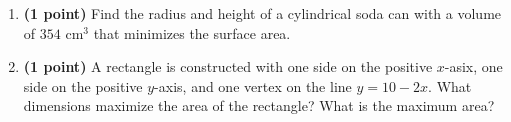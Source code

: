 \documentclass[12pt,letterpaper]{article}
\begin{document}
\begin{enumerate}
\item {\bf (1 point)} Find the radius and height of a cylindrical soda can with a volume of $354$ cm$^3$ that minimizes the surface area.
\item {\bf (1 point)} A rectangle is constructed with one side on the positive $x$-asix, one side on the positive $y$-axis, and one vertex on the line $y=10-2x$.  What dimensions maximize the area of the rectangle?  What is the maximum area?
		


\end{enumerate}
\end{document}
